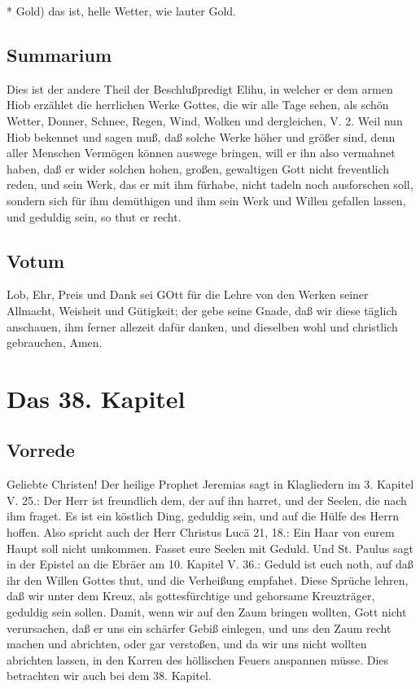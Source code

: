 * Gold) das ist, helle Wetter, wie lauter Gold.

\section{Summarium}

Dies ist der andere Theil der Beschlußpredigt Elihu, in welcher er dem armen Hiob erzählet die herrlichen Werke Gottes, die wir alle Tage sehen, als schön Wetter, Donner, Schnee, Regen, Wind, Wolken und dergleichen, V. 2. Weil nun Hiob bekennet und sagen muß, daß solche Werke höher und größer sind, denn aller Menschen Vermögen können auswege bringen, will er ihn also vermahnet haben, daß er wider solchen hohen, großen, gewaltigen Gott nicht freventlich reden, und sein Werk, das er mit ihm fürhabe, nicht tadeln noch ausforschen soll, sondern sich für ihm demüthigen und ihm sein Werk und Willen gefallen lassen, und geduldig sein, so thut er recht.

\section{Votum}

Lob, Ehr, Preis und Dank sei GOtt für die Lehre von den Werken seiner Allmacht, Weisheit und Gütigkeit; der gebe seine Gnade, daß wir diese täglich anschauen, ihm ferner allezeit dafür danken, und dieselben wohl und christlich gebrauchen, Amen.

\chapter{Das 38. Kapitel}

\section{Vorrede}

Geliebte Christen! Der heilige Prophet Jeremias sagt in Klagliedern im 3. Kapitel V. 25.: Der Herr ist freundlich dem, der auf ihn harret, und der Seelen, die nach ihm fraget. Es ist ein köstlich Ding, geduldig sein, und auf die Hülfe des Herrn hoffen. Also spricht auch der Herr Christus Lucä 21, 18.: Ein Haar von eurem Haupt soll nicht umkommen. Fasset eure Seelen mit Geduld. Und St. Paulus sagt in der Epistel an die Ebräer am 10. Kapitel V. 36.: Geduld ist euch noth, auf daß ihr den Willen Gottes thut, und die Verheißung empfahet.
Diese Sprüche lehren, daß wir unter dem Kreuz, als gottesfürchtige und gehorsame Kreuzträger, geduldig sein sollen. Damit, wenn wir auf den Zaum bringen wollten, Gott nicht verursachen, daß er uns ein schärfer Gebiß einlegen, und uns den Zaum recht machen und abrichten, oder gar verstoßen, und da wir uns nicht wollten abrichten lassen, in den Karren des höllischen Feuers anspannen müsse. Dies betrachten wir auch bei dem 38. Kapitel.

